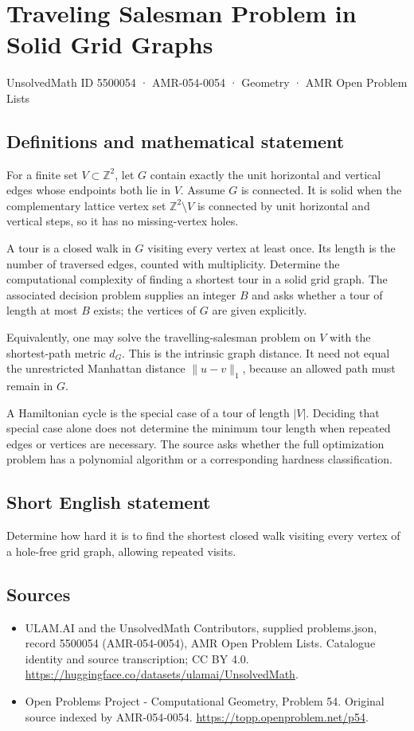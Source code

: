 \documentclass[11pt,a4paper]{article}
\begin{document}
\section*{Traveling Salesman Problem in Solid Grid Graphs}\label{5500054}
{\small UnsolvedMath ID 5500054 · AMR-054-0054 · Geometry · AMR Open Problem Lists}
\subsection{Definitions and mathematical statement}
For a finite set $V\subset\mathbb Z^2$, let $G$ contain exactly the
unit horizontal and vertical edges whose endpoints both lie in
$V$. Assume $G$ is connected. It is solid when the complementary
lattice vertex set $\mathbb Z^2\setminus V$ is connected by unit
horizontal and vertical steps, so it has no missing-vertex holes.

A tour is a closed walk in $G$ visiting every vertex at least once.
Its length is the number of traversed edges, counted with
multiplicity. Determine the computational complexity of finding
a shortest tour in a solid grid graph. The associated decision
problem supplies an integer $B$ and asks whether a tour of length
at most $B$ exists; the vertices of $G$ are given explicitly.

Equivalently, one may solve the travelling-salesman problem on
$V$ with the shortest-path metric $d_G$. This is the intrinsic
graph distance. It need not equal the unrestricted Manhattan
distance $\|u-v\|_1$, because an allowed path must remain in $G$.

A Hamiltonian cycle is the special case of a tour of length
$|V|$. Deciding that special case alone does not determine the
minimum tour length when repeated edges or vertices are necessary.
The source asks whether the full optimization problem has a
polynomial algorithm or a corresponding hardness classification.
\subsection{Short English statement}
Determine how hard it is to find the shortest closed walk visiting
every vertex of a hole-free grid graph, allowing repeated visits.
\subsection{Sources}
\begin{itemize}
\item[S1] ULAM.AI and the UnsolvedMath Contributors, supplied problems.json, record 5500054 (AMR-054-0054), AMR Open Problem Lists. Catalogue identity and source transcription; CC BY 4.0.
\url{https://huggingface.co/datasets/ulamai/UnsolvedMath}.
\item[S2] Open Problems Project - Computational Geometry, Problem 54. Original source indexed by AMR-054-0054.
\url{https://topp.openproblem.net/p54}.
\end{itemize}
\end{document}
